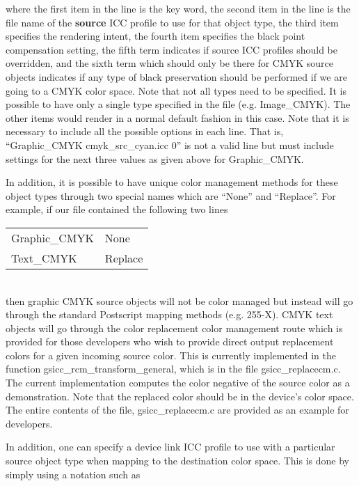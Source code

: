 \documentclass[12pt,notitlepage]{article}
\begin{document}
\noindent where the first item in the line is the key word, the second item in the line is the file name of the {\bf source} ICC profile to use for that object type, the third item specifies the rendering intent, the fourth item specifies the black point compensation setting, the fifth term indicates if source ICC profiles should be overridden, and the sixth term which should only be there for CMYK source objects indicates if any type of black preservation should be performed if we are going to a CMYK color space.  Note that not all types need to be specified.  It is possible to have only a single type specified in the file (e.g. Image\_CMYK).  The other items would render in a normal default fashion in this case.  Note that it is necessary to include all the possible options in each line.    That is, ``Graphic\_CMYK  cmyk\_src\_cyan.icc 0'' is not a valid line but must include settings for the next three values as given above for Graphic\_CMYK.

In addition, it is possible to have unique color management methods for these object types through two special names which are ``None'' and ``Replace''.   For example, if our file contained the following two lines\\

\begin{tabular}{ll}
Graphic\_CMYK & None \\
Text\_CMYK	& Replace  \\
\end{tabular}\\

\noindent then graphic CMYK source objects will not be color managed but instead will go through the standard Postscript mapping methods (e.g. 255-X).   CMYK text objects will go through the color replacement color management route which is provided for those developers who wish to provide direct output replacement colors for a given incoming source color.  This is currently implemented in the function gsicc\_rcm\_transform\_general, which is in the file gsicc\_replacecm.c.  The current implementation computes the color negative of the source color as a demonstration.  Note that the replaced color should be in the device's color space.   The entire contents of the file, gsicc\_replacecm.c are provided as an example for developers.

In addition, one can specify a device link ICC profile to use with a particular source object type when mapping to the destination color space.  This is done by simply using a notation such as\\
\end{document}
